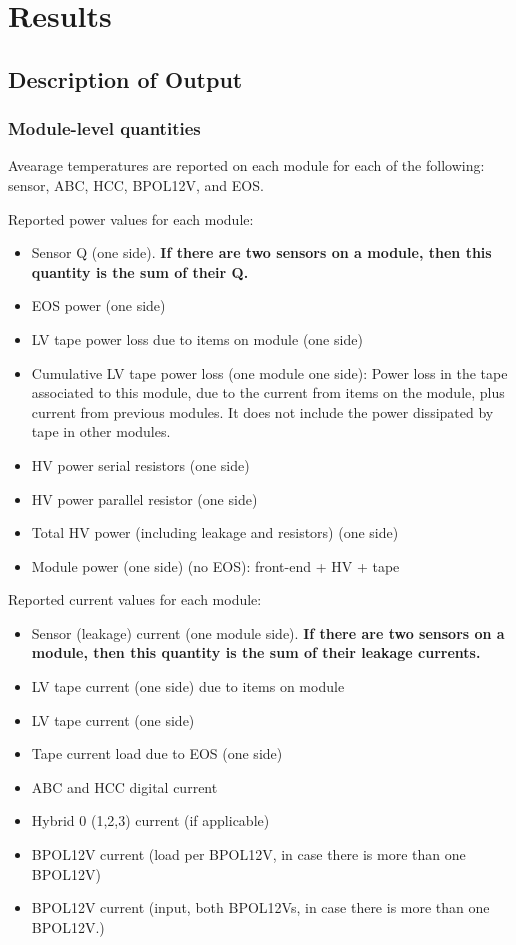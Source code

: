 
\newcommand{\mry}[2]{
\multirow{#1}{*}{Year #2}
}

\section{Results}

\subsection{Description of Output}
\label{description_of_output}
\subsubsection{Module-level quantities}
Avearage temperatures are reported on each module for each of the following: sensor, ABC, HCC, BPOL12V,
and EOS.

Reported power values for each module: 
\begin{itemize}
\setlength\itemsep{0.0em}
\item Sensor Q (one side). {\bf If there are two sensors on a module, then this quantity is the sum of
their Q.}
\item EOS power (one side)
\item LV tape power loss due to items on module (one side)
\item Cumulative LV tape power loss (one module one side):
Power loss in the tape associated to this module, due to the current from items on the module, plus
current from previous modules. It does not include the power dissipated by tape in other modules.
\item HV power serial resistors (one side)
\item HV power parallel resistor (one side)
\item Total HV power (including leakage and resistors) (one side)
\item Module power (one side) (no EOS): front-end + HV + tape
\end{itemize}

Reported current values for each module:
\begin{itemize}
\setlength\itemsep{0.0em}
\item Sensor (leakage) current (one module side). {\bf If there are two sensors on a module, then this
quantity is the sum of their leakage currents.}
\item LV tape current (one side) due to items on module
\item LV tape current (one side)
\item Tape current load due to EOS (one side)
\item ABC and HCC digital current
\item Hybrid 0 (1,2,3) current (if applicable)
\item BPOL12V current (load per BPOL12V, in case there is more than one BPOL12V)
\item BPOL12V current (input, both BPOL12Vs, in case there is more than one BPOL12V.)
\end{itemize}

